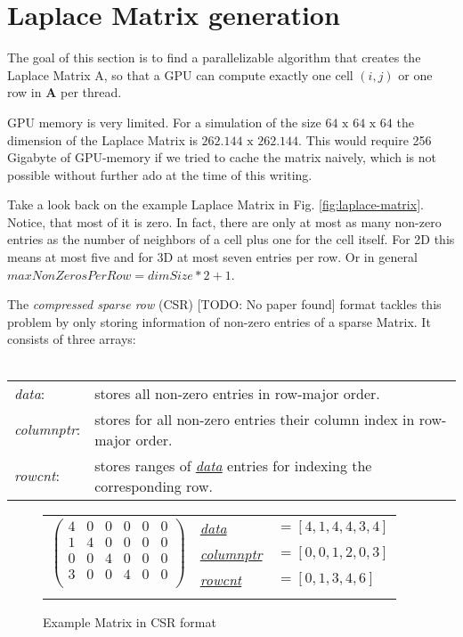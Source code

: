 \section{Laplace Matrix generation}
The goal of this section is to find a parallelizable algorithm that creates the Laplace Matrix A, so that a GPU can compute exactly one cell $(i,j)$ or one row in \textbf{A} per thread.
\par GPU memory is very limited. For a simulation of the size $64 \text{ x } 64 \text{ x } 64$ the dimension of the Laplace Matrix is $262.144 \text{ x } 262.144$. This would require 256 Gigabyte of GPU-memory if we tried to cache the matrix naively, which is not possible without further ado at the time of this writing. 
\par Take a look back on the example Laplace Matrix in Fig. \ref{fig:laplace-matrix}. Notice, that most of it is zero. In fact, there are only at most as many non-zero entries as the number of neighbors of a cell plus one for the cell itself. For 2D this means at most five and for 3D at most seven entries per row. Or in general $maxNonZerosPerRow = dimSize * 2 + 1$.
\par The \textit{compressed sparse row} (CSR) [TODO: No paper found] format tackles this problem by only storing information of non-zero entries of a sparse Matrix. It consists of three arrays:\\\\
\begin{tabular}{ll}
	\textit{data\label{csr-data}}: & stores all non-zero entries in row-major order.\\
	\textit{columnptr\label{csr-columnptr}}: & stores for all non-zero entries their column index in row-major order.\\
	\textit{rowcnt\label{csr-rowcnt}}: & stores ranges of \hyperref[csr-data]{\textit{data}} entries for indexing the corresponding row.\\
\end{tabular}
\begin{figure*}
	\centering
	\begin{tabular}{lll}
	\multirow{3}{*}{$\left( {\begin{array}{cccccc}
   4 & 0 & 0 & 0 & 0 & 0  \\
   1 & 4 & 0 & 0 & 0 & 0  \\
   0 & 0 & 4 & 0 & 0 & 0  \\
   3 & 0 & 0 & 4 & 0 & 0  \\
  \end{array} } \right)$}
	& \hyperref[csr-data]{\textit{data}} & $=[4,1,4,4,3,4]$  \\
	& \hyperref[csr-columnptr]{\textit{columnptr}} & $=[0,0,1,2,0,3]$ \\
	& \hyperref[csr-rowcnt]{\textit{rowcnt}} & $=[0,1,3,4,6]$ \\
	& & 
	\end{tabular}
\caption{Example Matrix in CSR format}\label{fig:csr-matrix}
\end{figure*}
